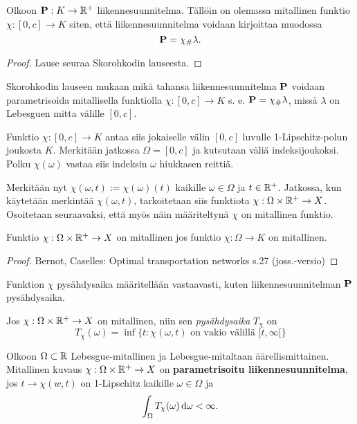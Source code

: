\begin{theorem}
    Olkoon $\P: K \to \R^+$ liikennesuunnitelma. Tällöin on olemassa mitallinen funktio $\chi: [0, c] \to K$ siten, että liikennesuunnitelma voidaan kirjoittaa muodossa $$\P =\chi_\# \lambda.$$
\end{theorem}
\begin{proof}
    Lause seuraa Skorohkodin lauseesta.
\end{proof}
Skorohkodin lauseen mukaan mikä tahansa liikennesuunnitelma $\P$ voidaan parametrisoida mitallisella funktiolla $ \chi: [0, c] \to K$ s. e. $\P = \chi_\# \lambda$, missä $\lambda$ on Lebesguen mitta välille $[0,c]$. 

Funktio $ \chi:[0, c] \to K$ antaa siis jokaiselle välin $[0, c]$ luvulle 1-Lipschitz-polun joukosta $K$. 
Merkitään jatkossa $\Omega = [0,c]$ ja kutsutaan väliä indeksijoukoksi. Polku $ \chi(\omega)$ vastaa siis indeksin $\omega$ hiukkasen reittiä.

Merkitään nyt $\chi(\omega, t) :=  \chi(\omega)(t)$ kaikille $\omega \in \Omega$ ja $t \in \R^+$. Jatkossa, kun käytetään merkintää $\chi(\omega, t)$, tarkoitetaan siis funktiota $\chi : \Omega \times \R^+ \to X$. Osoitetaan seuraavaksi, että myös näin määriteltynä $\chi$ on mitallinen funktio.

\begin{theorem}
    Funktio $\chi: \Omega \times \R^+ \to X $ on mitallinen jos funktio $ \chi: \Omega \to K$ on mitallinen.
\end{theorem}
\begin{proof}
Bernot, Caselles: Optimal transportation networks s.27 (joss.-versio)
\end{proof}
Funktion $\chi$ pysähdysaika määritellään vastaavasti, kuten liikennesuunnitelman $\P$ pysähdysaika.
\begin{definition}
    Jos $\chi: \Omega \times \R^+ \to X$ on mitallinen, niin sen \textit{pysähdysaika} $T_\chi$ on
    \[T_\chi (\omega) = \inf\{t : \chi(\omega, t) \text{ on vakio välillä } [t,\infty[\}\]
\end{definition}

\begin{definition}
    Olkoon $\Omega \subset \R$ Lebesgue-mitallinen ja Lebesgue-mitaltaan äärellismittainen. Mitallinen kuvaus $\chi: \Omega \times \R^+ \to X$ on \textbf{parametrisoitu liikennesuunnitelma}, jos $t\to \chi(w,t)$ on 1-Lipschitz kaikille $\omega \in \Omega$ ja
    \[\int_\Omega T_\chi (\omega) \, \d \omega < \infty .\]
\end{definition}

